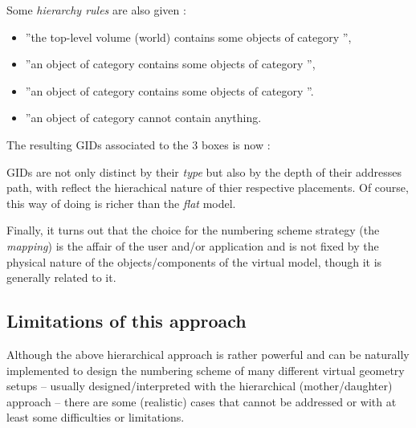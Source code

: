 \begin{itemize}
    \pn Some \emph{hierarchy rules} are also given :

    \begin{itemize}

    \item  ''the  top-level volume (world)  contains some
    objects of category '',

    \item  ''an object  of category   contains some
    objects of category '',

    \item  ''an object  of category   contains some
    objects of category ''.

    \item  ''an object  of category  cannot contain anything.

    \end{itemize}

    \pn The resulting GIDs associated to the 3 boxes is now :
    
    \begin{center}
      \scalebox{1.0}{}
    \end{center}

    \pn GIDs are not only distinct by their \emph{type} but also
    by the depth of their addresses path, with reflect the hierachical
    nature of thier respective placements. Of course, this way of doing 
    is richer than the \emph{flat} model.
\end{itemize}

\pn Finally,  it turns  out that the  choice for the  numbering scheme
strategy  (the  \emph{mapping})  is  the  affair of  the  user  and/or
application  and  is   not  fixed  by  the  physical   nature  of  the
objects/components  of  the  virtual  model, though  it  is  generally
related to it.

\subsection{Limitations of this approach}

\pn Although  the above hierarchical  approach is rather  powerful and
can be  naturally implemented to  design the numbering scheme  of many
different virtual geometry setups -- usually designed/interpreted with
the  hierarchical   (mother/daughter)  approach  --   there  are  some
(realistic)  cases that  cannot be  addressed  or with  at least  some
difficulties or limitations.

